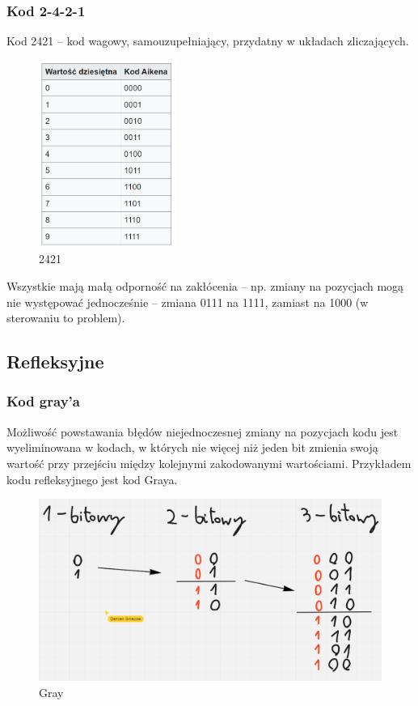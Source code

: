 \subsubsection{Kod 2-4-2-1}

Kod 2421 – kod wagowy, samouzupełniający, przydatny w układach zliczających.

\begin{figure}[h!]
    \centering
    \includegraphics[width=0.4\textwidth]{images/codes/2421.png}
    \caption{2421}
    \label{fig:my_label}
\end{figure}

Wszystkie mają małą odporność na zakłócenia – np. zmiany na pozycjach mogą nie
występować jednocześnie – zmiana 0111 na 1111, zamiast na 1000 (w sterowaniu to problem).

\newpage

\subsection{Refleksyjne}

\subsubsection{Kod gray'a}

Możliwość powstawania błędów niejednoczesnej zmiany na pozycjach kodu jest
wyeliminowana w kodach, w których nie więcej niż jeden bit zmienia swoją wartość przy
przejściu między kolejnymi zakodowanymi wartościami.
Przykładem kodu refleksyjnego jest kod Graya.

\begin{figure}[h!]
    \centering
    \includegraphics[width=.8\textwidth]{images/codes/kod_graya.png}
    \caption{Gray}
    \label{fig:my_label}
\end{figure}

